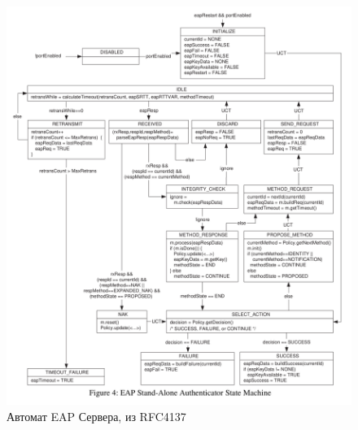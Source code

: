 \documentclass[oneside, final, 14pt]{extarticle}
\begin{document}
\begin{figure}
  \centering \includegraphics{res/eap-server-state-machine-rfc4137.png}
  \caption{Автомат EAP Сервера, из RFC4137}
\end{figure}
\end{document}
